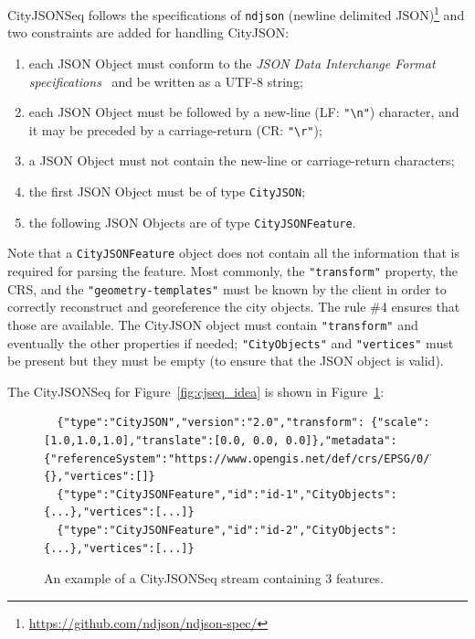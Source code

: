 \documentclass{isprs} %
\begin{document}
%

CityJSONSeq follows the specifications of \texttt{ndjson} (newline delimited JSON)\footnote{\url{https://github.com/ndjson/ndjson-spec/}} and two constraints are added for handling CityJSON\@:
\begin{enumerate}
  \item each JSON Object must conform to the \emph{JSON Data Interchange Format specifications}~\citep{IETF-JSON} and be written as a UTF-8 string;
  \item each JSON Object must be followed by a new-line (LF: \texttt{"\textbackslash n"}) character, and it may be preceded by a carriage-return (CR: \texttt{"\textbackslash r"});
  \item a JSON Object must not contain the new-line or carriage-return characters;
  \item the first JSON Object must be of type \texttt{CityJSON};
  \item the following JSON Objects are of type \texttt{CityJSONFeature}.
\end{enumerate}

Note that a \texttt{CityJSONFeature} object does not contain all the information that is required for parsing the feature. 
Most commonly, the \texttt{"transform"} property, the CRS, and the \texttt{"geometry-templates"} must be known by the client in order to correctly reconstruct and georeference the city objects. 
The rule \#4 ensures that those are available. 
The CityJSON object must contain \texttt{"transform"} and eventually the other properties if needed; \texttt{"CityObjects"} and \texttt{"vertices"} must be present but they must be empty (to ensure that the JSON object is valid).

%

The CityJSONSeq for Figure~\ref{fig:cjseq_idea} is shown in Figure~\ref{fig:stream}:
\begin{figure}
  \begin{lstlisting}
  {"type":"CityJSON","version":"2.0","transform": {"scale":[1.0,1.0,1.0],"translate":[0.0, 0.0, 0.0]},"metadata":{"referenceSystem":"https://www.opengis.net/def/crs/EPSG/0/7415"},"CityObjects":{},"vertices":[]}
  {"type":"CityJSONFeature","id":"id-1","CityObjects":{...},"vertices":[...]} 
  {"type":"CityJSONFeature","id":"id-2","CityObjects":{...},"vertices":[...]} 
  \end{lstlisting}
\caption{An example of a CityJSONSeq stream containing 3 features.}%
\label{fig:stream}
\end{figure}
\end{document}

